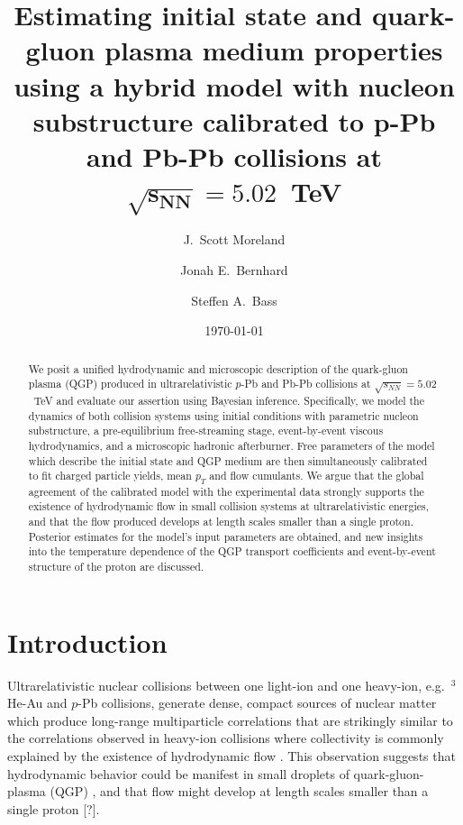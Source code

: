 \documentclass[aps,prc,reprint,amsmath,nofootinbib]{revtex4-1}
\newcommand{\sqrts}{\sqrt{s_{NN}}}
\newcommand{\note}{\textcolor{theblue}{[?]}}
\def\\#1{ #1}
\begin{document}
\title{
  Estimating initial state and quark-gluon plasma medium properties \\
  using a hybrid model with nucleon substructure \\
  calibrated to p-Pb and Pb-Pb collisions at \texorpdfstring{$\mathbf{\sqrts=5.02}$}{}~TeV
}

\author{J.\ Scott Moreland}
\author{Jonah E.\ Bernhard}
\author{Steffen A.\ Bass}


\date{\today}

\begin{abstract}
We posit a unified hydrodynamic and microscopic description of the quark-gluon plasma (QGP) produced in ultrarelativistic $p$-Pb and Pb-Pb collisions at $\sqrts=5.02$~TeV and evaluate our assertion using Bayesian inference. Specifically, we model the dynamics of both collision systems using initial conditions with parametric nucleon substructure, a pre-equilibrium free-streaming stage, event-by-event viscous hydrodynamics, and a microscopic hadronic afterburner.
Free parameters of the model which describe the initial state and QGP medium are then simultaneously calibrated to fit charged particle yields, mean $p_T$ and flow cumulants.
We argue that the global agreement of the calibrated model with the experimental data strongly supports the existence of hydrodynamic flow in small collision systems at ultrarelativistic energies, and that the flow produced develops at length scales smaller than a single proton.
Posterior estimates for the model's input parameters are obtained, and new insights into the temperature dependence of the QGP transport coefficients and event-by-event structure of the proton are discussed.
\end{abstract}

\maketitle


\section{Introduction}

Ultrarelativistic nuclear collisions between one light-ion and one heavy-ion, e.g.\ $^3$He-Au and $p$-Pb collisions, generate dense, compact sources of nuclear matter which produce long-range multiparticle correlations that are strikingly similar to the correlations observed in heavy-ion collisions where collectivity is commonly explained by the existence of hydrodynamic flow \cite{CMS:2012qk, Abelev:2012ola, Aad:2012gla, Adare:2015ctn}.
This observation suggests that hydrodynamic behavior could be manifest in small droplets of quark-gluon-plasma (QGP) \cite{Bozek:2011if, Bozek:2013uha}, and that flow might develop at length scales smaller than a single proton \note.
\end{document}
